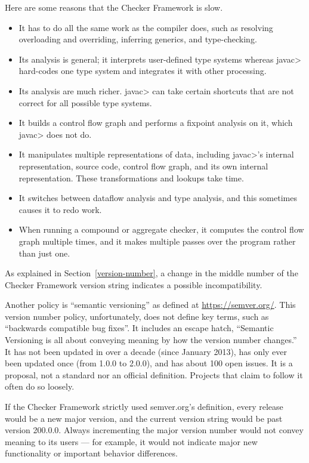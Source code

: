 Here are some reasons that the Checker Framework is slow.
\begin{itemize}
\item
  It has to do all the same work as the compiler does, such as resolving
  overloading and overriding, inferring generics, and type-checking.
\item
  Its analysis is general; it interprets user-defined type systems whereas
  \<javac> hard-codes one type system and integrates it with other processing.
\item
  Its analysis are much richer.  \<javac> can take certain shortcuts that
  are not correct for all possible type systems.
\item
  It builds a control flow graph and performs a fixpoint analysis on it,
  which \<javac> does not do.
\item
  It manipulates multiple representations of data, including \<javac>'s
  internal representation, source code, control flow graph, and its own
  internal representation.  These transformations and lookups take time.
\item
  It switches between dataflow analysis and type analysis, and this
  sometimes causes it to redo work.
\item
  When running a compound or aggregate checker, it computes the control
  flow graph multiple times, and it makes multiple passes over the program
  rather than just one.
\end{itemize}



As explained in Section~\ref{version-number}, a change in the middle number
of the Checker Framework version string indicates a possible
incompatibility.

Another policy is ``semantic versioning'' as defined at
\url{https://semver.org/}.  This version number policy, unfortunately,
does not define key terms, such as ``backwards compatible bug fixes''.  It
includes an
escape hatch, ``Semantic Versioning is all about conveying meaning by how
the version number changes.''  It has not been updated in over a decade
(since January 2013), has only ever been updated once (from
1.0.0 to 2.0.0), and has
about 100 open issues.
It is a proposal, not a standard nor an official definition.
Projects that claim to follow it often do so loosely.

If the Checker Framework strictly used semver.org's definition, every
release would be a new major version, and the current version string would
be
past version 200.0.0.
Always incrementing the major version number would not convey meaning to
its users --- for example, it would not indicate major new functionality or
important behavior differences.

